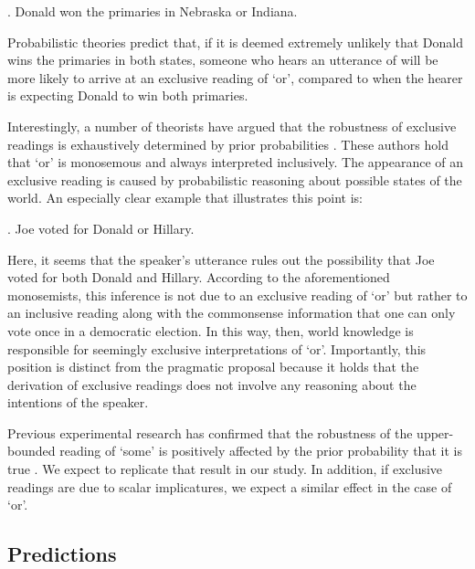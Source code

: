 \documentclass[12pt]{article}
\begin{document}
\ex.	Donald won the primaries in Nebraska or Indiana.

Probabilistic theories predict that, if it is deemed extremely unlikely that Donald wins the primaries in both states, someone who hears an utterance of \Last will be more likely to arrive at an exclusive reading of `or', compared to when the hearer is expecting Donald to win both primaries.

Interestingly, a number of theorists have argued that the robustness of exclusive readings is exhaustively determined by prior probabilities \citep[e.g.,][]{rubin1989, yanal1988}. These authors hold that `or' is monosemous and always interpreted inclusively. The appearance of an exclusive reading is caused by probabilistic reasoning about possible states of the world. An especially clear example that illustrates this point is:

\ex.	Joe voted for Donald or Hillary.

Here, it seems that the speaker's utterance rules out the possibility that Joe voted for both Donald and Hillary. According to the aforementioned monosemists, this inference is not due to an exclusive reading of `or' but rather to an inclusive reading along with the commonsense information that one can only vote once in a democratic election. In this way, then, world knowledge is responsible for seemingly exclusive interpretations of `or'. Importantly, this position is distinct from the pragmatic proposal because it holds that the derivation of exclusive readings does not involve any reasoning about the intentions of the speaker.

Previous experimental research has confirmed that the robustness of the upper-bounded reading of `some' is positively affected by the prior probability that it is true \citep{degen2015}. We expect to replicate that result in our study. In addition, if exclusive readings are due to scalar implicatures, we expect a similar effect in the case of `or'.

\subsection*{Predictions}
\end{document}
